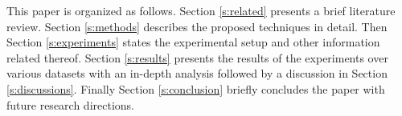 This paper is organized as follows. Section \ref{s:related} presents a brief literature review. Section \ref{s:methods} describes the proposed techniques in detail. Then Section \ref{s:experiments} states the experimental setup and other information related thereof. Section \ref{s:results} presents the results of the experiments over various datasets with an in-depth analysis followed by a discussion in Section \ref{s:discussions}. Finally Section \ref{s:conclusion} briefly concludes the paper with future research directions. 
